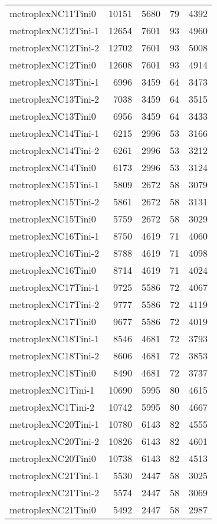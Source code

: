 \begin{longtable}{lrrrr}
metroplexNC11Tini0 & 10151 & 5680 & 79 & 4392 \\
metroplexNC12Tini-1 & 12654 & 7601 & 93 & 4960 \\
metroplexNC12Tini-2 & 12702 & 7601 & 93 & 5008 \\
metroplexNC12Tini0 & 12608 & 7601 & 93 & 4914 \\
metroplexNC13Tini-1 & 6996 & 3459 & 64 & 3473 \\
metroplexNC13Tini-2 & 7038 & 3459 & 64 & 3515 \\
metroplexNC13Tini0 & 6956 & 3459 & 64 & 3433 \\
metroplexNC14Tini-1 & 6215 & 2996 & 53 & 3166 \\
metroplexNC14Tini-2 & 6261 & 2996 & 53 & 3212 \\
metroplexNC14Tini0 & 6173 & 2996 & 53 & 3124 \\
metroplexNC15Tini-1 & 5809 & 2672 & 58 & 3079 \\
metroplexNC15Tini-2 & 5861 & 2672 & 58 & 3131 \\
metroplexNC15Tini0 & 5759 & 2672 & 58 & 3029 \\
metroplexNC16Tini-1 & 8750 & 4619 & 71 & 4060 \\
metroplexNC16Tini-2 & 8788 & 4619 & 71 & 4098 \\
metroplexNC16Tini0 & 8714 & 4619 & 71 & 4024 \\
metroplexNC17Tini-1 & 9725 & 5586 & 72 & 4067 \\
metroplexNC17Tini-2 & 9777 & 5586 & 72 & 4119 \\
metroplexNC17Tini0 & 9677 & 5586 & 72 & 4019 \\
metroplexNC18Tini-1 & 8546 & 4681 & 72 & 3793 \\
metroplexNC18Tini-2 & 8606 & 4681 & 72 & 3853 \\
metroplexNC18Tini0 & 8490 & 4681 & 72 & 3737 \\
metroplexNC1Tini-1 & 10690 & 5995 & 80 & 4615 \\
metroplexNC1Tini-2 & 10742 & 5995 & 80 & 4667 \\
metroplexNC20Tini-1 & 10780 & 6143 & 82 & 4555 \\
metroplexNC20Tini-2 & 10826 & 6143 & 82 & 4601 \\
metroplexNC20Tini0 & 10738 & 6143 & 82 & 4513 \\
metroplexNC21Tini-1 & 5530 & 2447 & 58 & 3025 \\
metroplexNC21Tini-2 & 5574 & 2447 & 58 & 3069 \\
metroplexNC21Tini0 & 5492 & 2447 & 58 & 2987 \\

\end{longtable}
